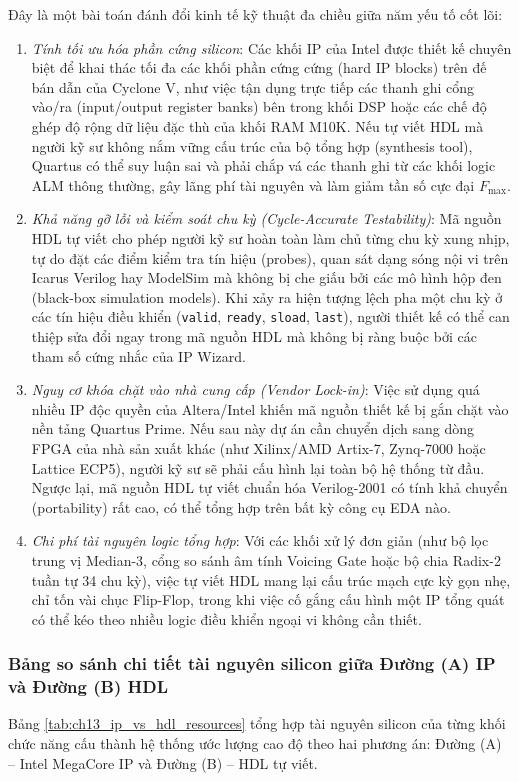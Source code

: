 Đây là một bài toán đánh đổi kinh tế kỹ thuật đa chiều giữa năm yếu tố cốt lõi:
\begin{enumerate}
    \item \emph{Tính tối ưu hóa phần cứng silicon}: Các khối IP của Intel được thiết kế chuyên biệt để khai thác tối đa các khối phần cứng cứng (hard IP blocks) trên đế bán dẫn của Cyclone V, như việc tận dụng trực tiếp các thanh ghi cổng vào/ra (input/output register banks) bên trong khối DSP hoặc các chế độ ghép độ rộng dữ liệu đặc thù của khối RAM M10K. Nếu tự viết HDL mà người kỹ sư không nắm vững cấu trúc của bộ tổng hợp (synthesis tool), Quartus có thể suy luận sai và phải chắp vá các thanh ghi từ các khối logic ALM thông thường, gây lãng phí tài nguyên và làm giảm tần số cực đại $F_{\max}$.
    \item \emph{Khả năng gỡ lỗi và kiểm soát chu kỳ (Cycle-Accurate Testability)}: Mã nguồn HDL tự viết cho phép người kỹ sư hoàn toàn làm chủ từng chu kỳ xung nhịp, tự do đặt các điểm kiểm tra tín hiệu (probes), quan sát dạng sóng nội vi trên Icarus Verilog hay ModelSim mà không bị che giấu bởi các mô hình hộp đen (black-box simulation models). Khi xảy ra hiện tượng lệch pha một chu kỳ ở các tín hiệu điều khiển (\texttt{valid}, \texttt{ready}, \texttt{sload}, \texttt{last}), người thiết kế có thể can thiệp sửa đổi ngay trong mã nguồn HDL mà không bị ràng buộc bởi các tham số cứng nhắc của IP Wizard.
    \item \emph{Nguy cơ khóa chặt vào nhà cung cấp (Vendor Lock-in)}: Việc sử dụng quá nhiều IP độc quyền của Altera/Intel khiến mã nguồn thiết kế bị gắn chặt vào nền tảng Quartus Prime. Nếu sau này dự án cần chuyển dịch sang dòng FPGA của nhà sản xuất khác (như Xilinx/AMD Artix-7, Zynq-7000 hoặc Lattice ECP5), người kỹ sư sẽ phải cấu hình lại toàn bộ hệ thống từ đầu. Ngược lại, mã nguồn HDL tự viết chuẩn hóa Verilog-2001 có tính khả chuyển (portability) rất cao, có thể tổng hợp trên bất kỳ công cụ EDA nào.
    \item \emph{Chi phí tài nguyên logic tổng hợp}: Với các khối xử lý đơn giản (như bộ lọc trung vị Median-3, cổng so sánh âm tính Voicing Gate hoặc bộ chia Radix-2 tuần tự 34 chu kỳ), việc tự viết HDL mang lại cấu trúc mạch cực kỳ gọn nhẹ, chỉ tốn vài chục Flip-Flop, trong khi việc cố gắng cấu hình một IP tổng quát có thể kéo theo nhiều logic điều khiển ngoại vi không cần thiết.
\end{enumerate}

\subsubsection*{Bảng so sánh chi tiết tài nguyên silicon giữa Đường (A) IP và Đường (B) HDL}
Bảng \ref{tab:ch13_ip_vs_hdl_resources} tổng hợp tài nguyên silicon của từng khối chức năng cấu thành hệ thống ước lượng cao độ theo hai phương án: Đường (A) -- Intel MegaCore IP và Đường (B) -- HDL tự viết.

